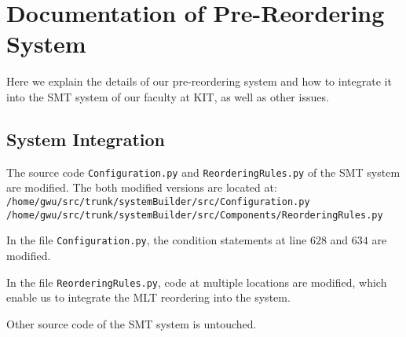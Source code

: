 

\appendix

{}	%
{}	%




%		
%		
%
%


\section{Documentation of Pre-Reordering System}
		\label{Documentation}

Here we explain the details of our pre-reordering system and how to integrate it into the SMT system of our faculty at KIT, as well as other issues.

\subsection{System Integration}

The source code \verb|Configuration.py| and \verb|ReorderingRules.py| of the SMT system are modified. The both modified versions are located at:\\
\verb|/home/gwu/src/trunk/systemBuilder/src/Configuration.py|\\
\verb|/home/gwu/src/trunk/systemBuilder/src/Components/ReorderingRules.py|

In the file \verb|Configuration.py|, the condition statements at line $628$ and $634$ are modified.

In the file \verb|ReorderingRules.py|, code at multiple locations are modified, which enable us to integrate the MLT reordering into the system.

Other source code of the SMT system is untouched.

